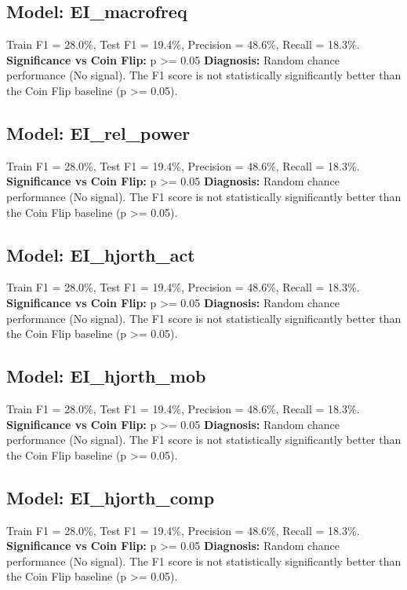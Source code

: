 \subsection*{Model: EI_macrofreq}
Train F1 = 28.0\%, Test F1 = 19.4\%, Precision = 48.6\%, Recall = 18.3\%.
\newline
\textbf{Significance vs Coin Flip:} p >= 0.05
\newline
\textbf{Diagnosis:} Random chance performance (No signal). The F1 score is not statistically significantly better than the Coin Flip baseline (p >= 0.05).

\subsection*{Model: EI_rel_power}
Train F1 = 28.0\%, Test F1 = 19.4\%, Precision = 48.6\%, Recall = 18.3\%.
\newline
\textbf{Significance vs Coin Flip:} p >= 0.05
\newline
\textbf{Diagnosis:} Random chance performance (No signal). The F1 score is not statistically significantly better than the Coin Flip baseline (p >= 0.05).

\subsection*{Model: EI_hjorth_act}
Train F1 = 28.0\%, Test F1 = 19.4\%, Precision = 48.6\%, Recall = 18.3\%.
\newline
\textbf{Significance vs Coin Flip:} p >= 0.05
\newline
\textbf{Diagnosis:} Random chance performance (No signal). The F1 score is not statistically significantly better than the Coin Flip baseline (p >= 0.05).

\subsection*{Model: EI_hjorth_mob}
Train F1 = 28.0\%, Test F1 = 19.4\%, Precision = 48.6\%, Recall = 18.3\%.
\newline
\textbf{Significance vs Coin Flip:} p >= 0.05
\newline
\textbf{Diagnosis:} Random chance performance (No signal). The F1 score is not statistically significantly better than the Coin Flip baseline (p >= 0.05).

\subsection*{Model: EI_hjorth_comp}
Train F1 = 28.0\%, Test F1 = 19.4\%, Precision = 48.6\%, Recall = 18.3\%.
\newline
\textbf{Significance vs Coin Flip:} p >= 0.05
\newline
\textbf{Diagnosis:} Random chance performance (No signal). The F1 score is not statistically significantly better than the Coin Flip baseline (p >= 0.05).
